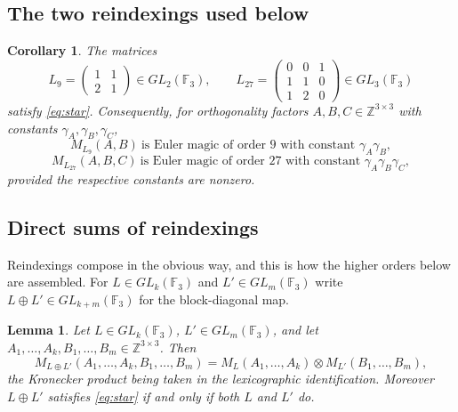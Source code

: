 \documentclass[11pt,a4paper]{amsart}
\theoremstyle{plain}
\newtheorem{lemma}[theorem]{Lemma}
\newtheorem{corollary}[theorem]{Corollary}
\theoremstyle{definition}
\theoremstyle{remark}
\newcommand{\FF}{\mathbb{F}}
\newcommand{\ZZ}{\mathbb{Z}}
\begin{document}
\subsection{The two reindexings used below}

\begin{corollary}\label{cor:LL}
The matrices
\[
L_9=\begin{pmatrix}1&1\\2&1\end{pmatrix}\in GL_2(\FF_3),
\qquad
L_{27}=\begin{pmatrix}0&0&1\\1&1&0\\1&2&0\end{pmatrix}\in GL_3(\FF_3)
\]
satisfy \eqref{eq:star}. Consequently, for orthogonality factors
$A,B,C\in\ZZ^{3\times3}$ with constants $\gamma_A,\gamma_B,\gamma_C$,
\[
M_{L_9}(A,B)\ \text{is Euler magic of order }9\text{ with constant }
\gamma_A\gamma_B,
\]
\[
M_{L_{27}}(A,B,C)\ \text{is Euler magic of order }27\text{ with constant }
\gamma_A\gamma_B\gamma_C,
\]
provided the respective constants are nonzero.
\end{corollary}

\subsection{Direct sums of reindexings}

Reindexings compose in the obvious way, and this is how the higher orders below
are assembled. For $L\in GL_k(\FF_3)$ and $L'\in GL_m(\FF_3)$ write
$L\oplus L'\in GL_{k+m}(\FF_3)$ for the block-diagonal map.

\begin{lemma}\label{lem:dsum}
Let $L\in GL_k(\FF_3)$, $L'\in GL_m(\FF_3)$, and let
$A_1,\dots,A_k,B_1,\dots,B_m\in\ZZ^{3\times3}$. Then
\begin{equation}\label{eq:dsum}
M_{L\oplus L'}(A_1,\dots,A_k,B_1,\dots,B_m)
= M_L(A_1,\dots,A_k)\otimes M_{L'}(B_1,\dots,B_m),
\end{equation}
the Kronecker product being taken in the lexicographic identification.
Moreover $L\oplus L'$ satisfies \eqref{eq:star} if and only if both $L$ and
$L'$ do.
\end{lemma}
\end{document}
